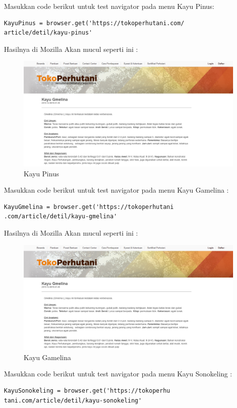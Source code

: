 Masukkan code berikut untuk test navigator pada menu Kayu Pinus:

\begin{verbatim}
KayuPinus = browser.get('https://tokoperhutani.com/
article/detil/kayu-pinus'
\end{verbatim}

Hasilnya  di Mozilla Akan mucul seperti ini :
\begin{figure}[h]
	\centering
	\includegraphics[scale=0.29]{figures/aa}
	\caption{Kayu Pinus}
\end{figure}

Masukkan code berikut untuk test navigator pada menu Kayu Gamelina :
\begin{verbatim}
KayuGmelina = browser.get('https://tokoperhutani
.com/article/detil/kayu-gmelina'
\end{verbatim}

Hasilnya  di Mozilla Akan mucul seperti ini :
\begin{figure}[h]
	\centering
	\includegraphics[scale=0.342]{figures/2kg}
	\caption{Kayu Gamelina}
\end{figure}

Masukkan code berikut untuk test navigator pada menu Kayu Sonokeling :
\begin{verbatim}
KayuSonokeling = browser.get('https://tokoperhu
tani.com/article/detil/kayu-sonokeling'
\end{verbatim}

